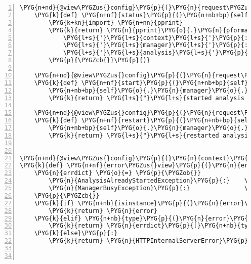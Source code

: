 \begin{Verbatim}[commandchars=\\\{\},numbers=left,firstnumber=1,stepnumber=5]
    \PYG{n+nd}{@view\PYGZus{}config}\PYG{p}{(}\PYG{n}{request\PYGZus{}method}\PYG{o}{=}\PYG{l+s}{'}\PYG{l+s}{GET}\PYG{l+s}{'}\PYG{p}{)}
    \PYG{k}{def} \PYG{n+nf}{status}\PYG{p}{(}\PYG{n+nb+bp}{self}\PYG{p}{)}\PYG{p}{:}
        \PYG{k+kn}{import} \PYG{n+nn}{pprint}
        \PYG{k}{return} \PYG{n}{pprint}\PYG{o}{.}\PYG{n}{pformat}\PYG{p}{(}\PYG{p}{\PYGZob{}}
            \PYG{l+s}{'}\PYG{l+s}{context}\PYG{l+s}{'}\PYG{p}{:} \PYG{n+nb+bp}{self}\PYG{p}{,} \PYG{c}{\PYGZsh{} Waitress}
            \PYG{l+s}{'}\PYG{l+s}{manager}\PYG{l+s}{'}\PYG{p}{:} \PYG{n+nb+bp}{self}\PYG{o}{.}\PYG{n}{manager}\PYG{p}{,} \PYG{c}{\PYGZsh{} Manager}
            \PYG{l+s}{'}\PYG{l+s}{analysis}\PYG{l+s}{'}\PYG{p}{:} \PYG{n+nb+bp}{self}\PYG{o}{.}\PYG{n}{analysis}\PYG{p}{,} \PYG{c}{\PYGZsh{} Analysis}
        \PYG{p}{\PYGZcb{}}\PYG{p}{)}

    \PYG{n+nd}{@view\PYGZus{}config}\PYG{p}{(}\PYG{n}{request\PYGZus{}method}\PYG{o}{=}\PYG{l+s}{'}\PYG{l+s}{START}\PYG{l+s}{'}\PYG{p}{)}
    \PYG{k}{def} \PYG{n+nf}{start}\PYG{p}{(}\PYG{n+nb+bp}{self}\PYG{p}{)}\PYG{p}{:}
        \PYG{n+nb+bp}{self}\PYG{o}{.}\PYG{n}{manager}\PYG{o}{.}\PYG{n}{analysis\PYGZus{}requested}\PYG{p}{(}\PYG{n+nb+bp}{self}\PYG{o}{.}\PYG{n}{analysis}\PYG{p}{)}
        \PYG{k}{return} \PYG{l+s}{"}\PYG{l+s}{started analysis \PYGZsh{}}\PYG{l+s+si}{\PYGZpc{}d}\PYG{l+s}{"} \PYG{o}{\PYGZpc{}} \PYG{n+nb+bp}{self}\PYG{o}{.}\PYG{n}{analysis}\PYG{o}{.}\PYG{n}{id}

    \PYG{n+nd}{@view\PYGZus{}config}\PYG{p}{(}\PYG{n}{request\PYGZus{}method}\PYG{o}{=}\PYG{l+s}{'}\PYG{l+s}{RESTART}\PYG{l+s}{'}\PYG{p}{)}
    \PYG{k}{def} \PYG{n+nf}{restart}\PYG{p}{(}\PYG{n+nb+bp}{self}\PYG{p}{)}\PYG{p}{:}
        \PYG{n+nb+bp}{self}\PYG{o}{.}\PYG{n}{manager}\PYG{o}{.}\PYG{n}{analysis\PYGZus{}requested}\PYG{p}{(}\PYG{n+nb+bp}{self}\PYG{o}{.}\PYG{n}{analysis}\PYG{p}{,} \PYG{n+nb+bp}{True}\PYG{p}{)}
        \PYG{k}{return} \PYG{l+s}{"}\PYG{l+s}{restarted analysis \PYGZsh{}}\PYG{l+s+si}{\PYGZpc{}d}\PYG{l+s}{"} \PYG{o}{\PYGZpc{}} \PYG{n+nb+bp}{self}\PYG{o}{.}\PYG{n}{analysis}\PYG{o}{.}\PYG{n}{id}


\PYG{n+nd}{@view\PYGZus{}config}\PYG{p}{(}\PYG{n}{context}\PYG{o}{=}\PYG{n+ne}{Exception}\PYG{p}{)}
\PYG{k}{def} \PYG{n+nf}{error\PYGZus{}view}\PYG{p}{(}\PYG{n}{error}\PYG{p}{,} \PYG{n}{request}\PYG{p}{)}\PYG{p}{:}
    \PYG{n}{errdict} \PYG{o}{=} \PYG{p}{\PYGZob{}}
        \PYG{n}{AnalysisAlreadyStartedException}\PYG{p}{:}    \PYG{n}{HTTPBadRequest}\PYG{p}{,}
        \PYG{n}{ManagerBusyException}\PYG{p}{:}               \PYG{n}{HTTPInternalServerError}\PYG{p}{,}
    \PYG{p}{\PYGZcb{}}
    \PYG{k}{if} \PYG{n+nb}{isinstance}\PYG{p}{(}\PYG{n}{error}\PYG{p}{,} \PYG{n}{HTTPError}\PYG{p}{)}\PYG{p}{:}
        \PYG{k}{return} \PYG{n}{error}
    \PYG{k}{elif} \PYG{n+nb}{type}\PYG{p}{(}\PYG{n}{error}\PYG{p}{)} \PYG{o+ow}{in} \PYG{n}{errdict}\PYG{p}{:}
        \PYG{k}{return} \PYG{n}{errdict}\PYG{p}{[}\PYG{n+nb}{type}\PYG{p}{(}\PYG{n}{error}\PYG{p}{)}\PYG{p}{]}\PYG{p}{(}\PYG{n}{error}\PYG{p}{)}
    \PYG{k}{else}\PYG{p}{:}
        \PYG{k}{return} \PYG{n}{HTTPInternalServerError}\PYG{p}{(}\PYG{n}{error}\PYG{p}{)}



\end{Verbatim}
